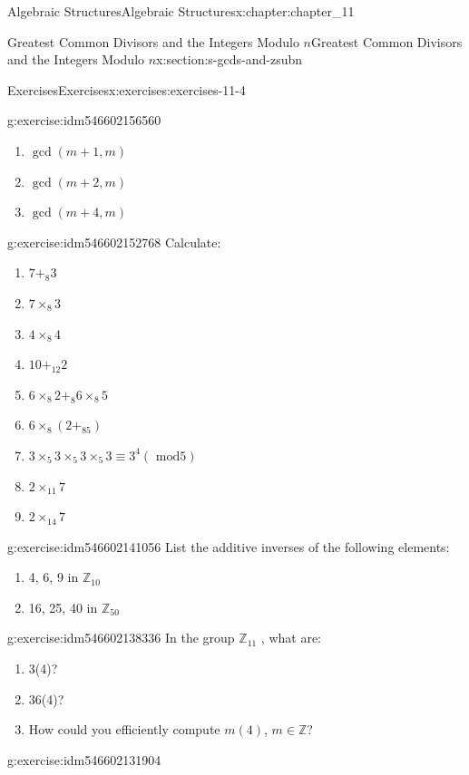 \documentclass[oneside,10pt,]{book}
\numberwithin{equation}{section}
\begin{document}
\begin{chapterptx}{Algebraic Structures}{}{Algebraic Structures}{}{}{x:chapter:chapter_11}
\begin{sectionptx}{Greatest Common Divisors  and the Integers Modulo \(n\)}{}{Greatest Common Divisors  and the Integers Modulo \(n\)}{}{}{x:section:s-gcds-and-zsubn}
\begin{exercises-subsection}{Exercises}{}{Exercises}{}{}{x:exercises:exercises-11-4}
\begin{divisionexercise}{2}{}{}{g:exercise:idm546602156560}
\begin{enumerate}[label=(\alph*)]
\item{}\(\gcd(m+1,m)\)%
\item{}\(\gcd(m+2,m)\)%
\item{}\(\gcd(m+4,m)\)%
\end{enumerate}
%
\end{divisionexercise}%
\begin{divisionexercise}{3}{}{}{g:exercise:idm546602152768}%
Calculate:%
\begin{multicols}{2}
\begin{enumerate}[label=(\alph*)]
\item{}\(7 +_8 3\)%
\item{}\(7 \times_8 3\)%
\item{}\(4\times_8 4\)%
\item{}\(10+_{12} 2\)%
\item{}\(6\times_8 2 +_8 6\times_8 5 \)%
\item{}\(6\times_8 \left(2 +_85\right)\)%
\item{}\(3 \times_5  3 \times_5  3 \times_5  3 \equiv  3^4 (\textrm{ mod} 5)\)%
\item{}\(2 \times_{11}7\)%
\item{}\(2 \times_{14}7\)%
\end{enumerate}
\end{multicols}
%
\end{divisionexercise}%
\begin{divisionexercise}{4}{}{}{g:exercise:idm546602141056}%
List the additive inverses of the following elements:%
\begin{enumerate}[label=(\alph*)]
\item{}4, 6, 9 in \(\mathbb{Z}_{10}\)%
\item{}16, 25, 40 in \(\mathbb{Z}_{50}\)%
\end{enumerate}
%
\end{divisionexercise}%
\begin{divisionexercise}{5}{}{}{g:exercise:idm546602138336}%
In the group \(\mathbb{Z}_{11}\) , what are:%
\begin{enumerate}[label=(\alph*)]
\item{}3(4)?%
\item{}36(4)?%
\item{}How could you efficiently compute \(m(4)\), \(m \in  \mathbb{Z}\)?%
\end{enumerate}
%
\end{divisionexercise}%
\begin{divisionexercise}{6}{}{}{g:exercise:idm546602131904}%

\end{divisionexercise}
\end{exercises-subsection}
\end{sectionptx}
\end{chapterptx}
\end{document}
